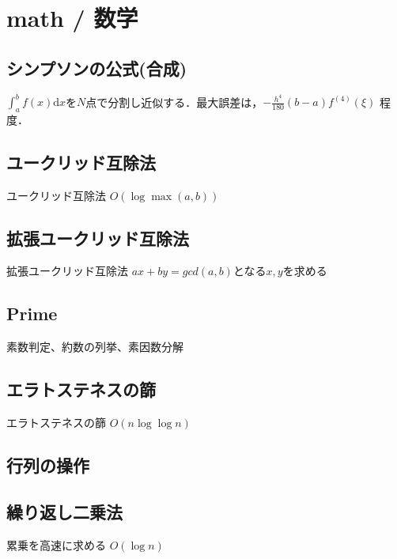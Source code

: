 \section{math / 数学}

\subsection{シンプソンの公式(合成)}
$\int_a^b f(x) \mathrm{d}x$を$N$点で分割し近似する．最大誤差は，$-\frac{h^4}{180}(b-a)f^{(4)}(\xi)$ 程度．


\subsection{ユークリッド互除法}
ユークリッド互除法
$O(\log \max(a,b))$


\subsection{拡張ユークリッド互除法}
拡張ユークリッド互除法
$ax + by = gcd(a,b)$となる$x,y$を求める


\subsection{Prime}
素数判定、約数の列挙、素因数分解


\subsection{エラトステネスの篩}
エラトステネスの篩
$O(n \log\log n)$


\subsection{行列の操作}


\subsection{繰り返し二乗法}
累乗を高速に求める
$O(\log n)$


